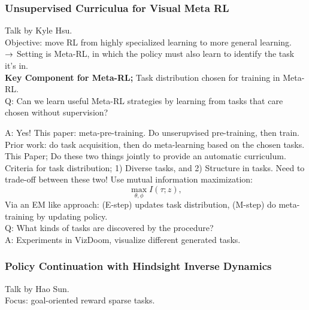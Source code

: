 \spacerule
\subsubsection{Unsupervised Curriculua for Visual Meta RL \cite{jabri2019unsupervised}}
% 
Talk by Kyle Hsu. \\

Objective: move RL from highly specialized learning to more general learning. \\

$\rightarrow$ Setting is Meta-RL, in which the policy must also learn to identify the task it's in. \\

{\bf Key Component for Meta-RL;} Task distribution chosen for training in Meta-RL. \\

Q: Can we learn useful Meta-RL strategies by learning from tasks that care chosen without supervision?

A: Yes! This paper: meta-pre-training. Do unserupvised pre-training, then train. \\

Prior work: do task acquisition, then do meta-learning based on the chosen tasks. \\

This Paper; Do these two things jointly to provide an automatic curriculum. \\

Criteria for task distribution; 1) Diverse tasks, and 2) Structure in tasks. Need to trade-off between these two! Use mutual information maximization:
\[
\max_{\theta, \phi} I(\tau; z),
\]
Via an EM like approach: (E-step) updates task distribution, (M-step) do meta-training by updating policy. \\

Q: What kinds of tasks are discovered by the procedure? \\

A: Experiments in VizDoom, visualize different generated tasks. \\

\spacerule
\subsubsection{Policy Continuation with Hindsight Inverse Dynamics \cite{sun2019policy}}

Talk by Hao Sun. \\

Focus: goal-oriented reward sparse tasks. \\

